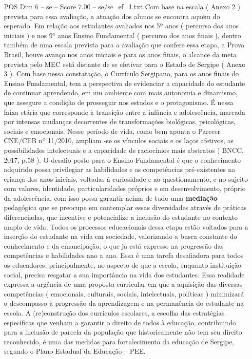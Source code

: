 \begin{textsample}{POS Dim 6 – se – Score 7.00 – se/se\_ef\_1.txt}
Com base na escala ( Anexo 2 ) prevista para essa avaliação, a atuação dos alunos se encontra aquém do esperado.
Em relação aos estudantes avaliados nos 5º anos ( percurso dos anos iniciais ) e nos 9º anos Ensino Fundamental ( percurso dos anos finais ), dentro também de uma escala prevista para a avaliação que confere essa etapa, a Prova Brasil, houve avanço nos anos iniciais e para os anos finais, o alcance da meta prevista pelo MEC está distante de se efetivar para o Estado de Sergipe ( Anexo 3 ).
Com base nessa constatação, o Currículo Sergipano, para os anos finais do Ensino Fundamental, tem a perspectiva de evidenciar a capacidade do estudante de continuar aprendendo, em um ambiente com mais autonomia e dinamismo, que assegure a condição de prosseguir nos estudos e o protagonismo.
É nessa faixa etária que corresponde à transição entre a infância e adolescência, marcada por intensas mudanças decorrentes de transformações biológicas, psicológicas, sociais e emocionais.
Nesse período de vida, como bem aponta o Parecer CNE/CEB nº 11/2010, ampliam -se os vínculos sociais e os laços afetivos, as possibilidades intelectuais e a capacidade de raciocínios mais abstratos ( BNCC, 2017, p.58 ).
O desafio posto para o Ensino Fundamental é que o conhecimento adquirido possa privilegiar as habilidades e as competências pré-existentes na criança dos anos iniciais, voltadas à curiosidade e ao questionamento, e no sujeito com valores, identidade, particularidades próprios e em desenvolvimento, próprio da adolescência, com isso possa garantir acima de tudo uma \textbf{mediação} pedagógica que se preocupe em contemplar essas diversidades através de práticas diferenciadas, que incentive e potencialize a inclusão do estudante no contexto amplo de vida.
Todos os processos educacionais dessa etapa estão voltados para a inserção do estudante na vida em sociedade, valorizando a busca constante do conhecimento e da emancipação, o que já está expresso na progressão das competências e habilidades ano a ano.
Essa é uma tarefa desafiadora para todos os educadores, principalmente, no aspecto de que a escola, enquanto instituição social, precisa resgatar a sua importância na vida dos estudantes.
Essa realidade expressa a urgência de uma proposta curricular em que a aquisição das diversas competências ( emocionais, culturais, sociais, intelectuais, políticas ) minimizará o descompasso à progressão da aprendizagem e na permanência do estudante na escola.
A (re)construção dos currículos escolares, a escolha das estratégias específicas que venham a garantir o direito de todos à educação, contribuindo para a inclusão de parcela da população que historicamente não tem seu direito reconhecido, é uma das medidas para fortalecimento da educação de Sergipe, segundo o Plano Estadual da Educação – PEE.

\end{textsample}
